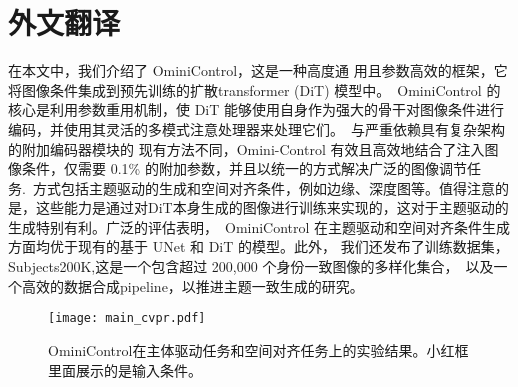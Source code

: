 \cleardoublepage

\newrefsection

\chapter{外文翻译}
在本文中，我们介绍了 OminiControl，这是一种高度通 用且参数高效的框架，它将图像条件集成到预先训练的扩散transformer (DiT) 模型中。\
 OminiControl 的核心是利用参数重用机制，使 DiT 能够使用自身作为强大的骨干对图像条件进行编码，并使用其灵活的多模式注意处理器来处理它们。\
 与严重依赖具有复杂架构的附加编码器模块的 现有方法不同，Omini-Control 有效且高效地结合了注入图像条件，仅需要 0.1\% 的附加参数，并且以统一的方式解决广泛的图像调节任务.\
 方式包括主题驱动的生成和空间对齐条件，例如边缘、深度图等。值得注意的是，这些能力是通过对DiT本身生成的图像进行训练来实现的，这对于主题驱动的生成特别有利。广泛的评估表明，\
 OminiControl 在主题驱动和空间对齐条件生成方面均优于现有的基于 UNet 和 DiT 的模型。此外， 我们还发布了训练数据集，Subjects200K,这是一个包含超过 200,000 个身份一致图像的多样化集合，\
 以及一个高效的数据合成pipeline，以推进主题一致生成的研究。
\begin{figure}[htbp]
    \centering
    \texttt{[image: main\_cvpr.pdf]}
    \caption{OminiControl在主体驱动任务和空间对齐任务上的实验结果。小红框里面展示的是输入条件。}
    \label{fig:example}
  \end{figure}
